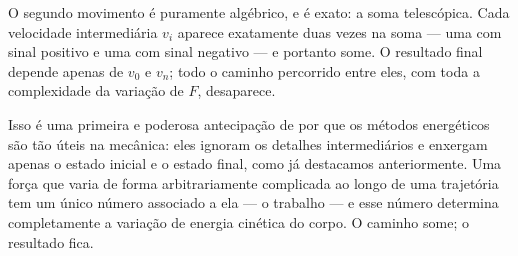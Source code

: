 O segundo movimento é puramente algébrico, e é exato: a soma telescópica.
Cada velocidade intermediária $v_i$ aparece exatamente duas vezes na soma
--- uma com sinal positivo e uma com sinal negativo --- e portanto some.
O resultado final depende apenas de $v_0$ e $v_n$; todo o caminho percorrido
entre eles, com toda a complexidade da variação de $F$, desaparece.

Isso é uma primeira e poderosa antecipação de por que os métodos energéticos
são tão úteis na mecânica: eles ignoram os detalhes intermediários e enxergam
apenas o estado inicial e o estado final, como já destacamos anteriormente. Uma força que varia de forma
arbitrariamente complicada ao longo de uma trajetória tem um único número
associado a ela --- o trabalho --- e esse número determina completamente a
variação de energia cinética do corpo. O caminho some; o resultado fica.
